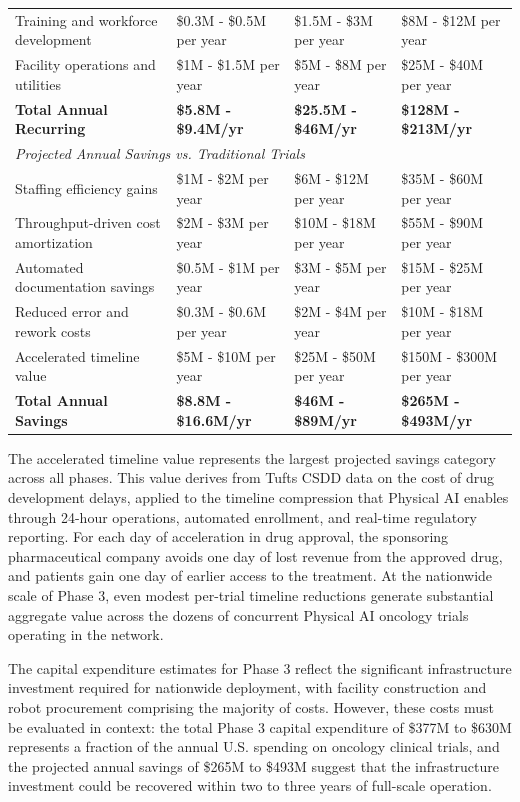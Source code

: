 \begin{longtable}{l p{3.2cm} p{3.2cm} p{3.2cm}}
Training and workforce development & \$0.3M - \$0.5M per year & \$1.5M - \$3M per year & \$8M - \$12M per year \\
Facility operations and utilities & \$1M - \$1.5M per year & \$5M - \$8M per year & \$25M - \$40M per year \\
\textbf{Total Annual Recurring} & \textbf{\$5.8M - \$9.4M/yr} & \textbf{\$25.5M - \$46M/yr} & \textbf{\$128M - \$213M/yr} \\
\midrule
\multicolumn{4}{l}{\textit{Projected Annual Savings vs. Traditional Trials}} \\
\midrule
Staffing efficiency gains & \$1M - \$2M per year & \$6M - \$12M per year & \$35M - \$60M per year \\
Throughput-driven cost amortization & \$2M - \$3M per year & \$10M - \$18M per year & \$55M - \$90M per year \\
Automated documentation savings & \$0.5M - \$1M per year & \$3M - \$5M per year & \$15M - \$25M per year \\
Reduced error and rework costs & \$0.3M - \$0.6M per year & \$2M - \$4M per year & \$10M - \$18M per year \\
Accelerated timeline value & \$5M - \$10M per year & \$25M - \$50M per year & \$150M - \$300M per year \\
\textbf{Total Annual Savings} & \textbf{\$8.8M - \$16.6M/yr} & \textbf{\$46M - \$89M/yr} & \textbf{\$265M - \$493M/yr} \\
\end{longtable}

The accelerated timeline value represents the largest projected savings
category across all phases. This value derives from Tufts CSDD \cite{tufts-delay}
data on the cost of drug development delays, applied to the timeline
compression that Physical AI enables through 24-hour operations, automated
enrollment, and real-time regulatory reporting. For each day of acceleration in
drug approval, the sponsoring pharmaceutical company avoids one day of lost
revenue from the approved drug, and patients gain one day of earlier access to
the treatment. At the nationwide scale of Phase 3, even modest per-trial
timeline reductions generate substantial aggregate value across the dozens of
concurrent Physical AI oncology trials operating in the network.

The capital expenditure estimates for Phase 3 reflect the significant
infrastructure investment required for nationwide deployment, with facility
construction and robot procurement comprising the majority of costs. However,
these costs must be evaluated in context: the total Phase 3 capital expenditure
of \$377M to \$630M represents a fraction of the annual U.S. spending on
oncology clinical trials, and the projected annual savings of \$265M to \$493M
suggest that the infrastructure investment could be recovered within two to
three years of full-scale operation.


